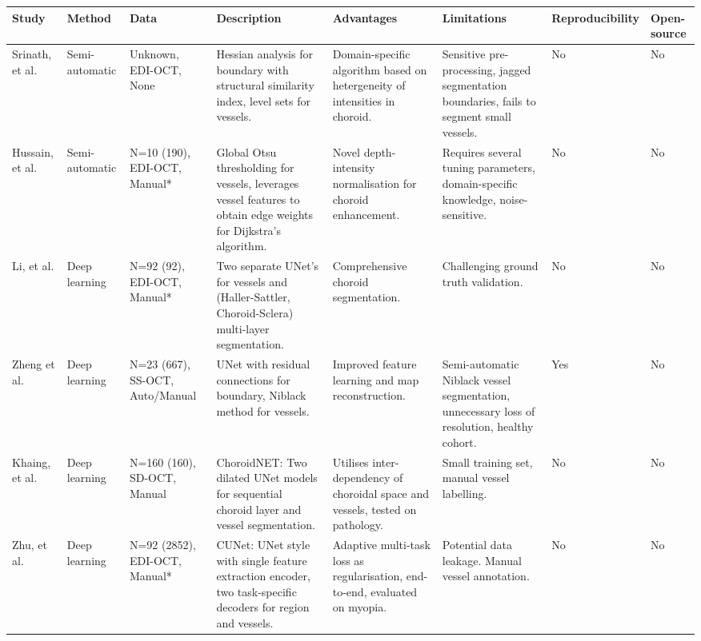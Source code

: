 \notsotiny

{\begin{longtable}{p{1cm}p{1cm}p{2cm}p{4.5cm}p{3.75cm}p{4cm}P{0.75cm}p{0.75cm}}
\toprule
Study & Method & Data & Description & Advantages & Limitations & Reproducibility & Open-source \\ \hline
\endfirsthead
\endhead
\midrule
\endfoot
\endlastfoot
Srinath, et al. \cite{srinath2014automated} & Semi-automatic & Unknown, EDI-OCT, None & Hessian analysis for boundary with structural similarity index, level sets for vessels. & Domain-specific algorithm based on hetergeneity of intensities in choroid. & Sensitive pre-processing, jagged segmentation boundaries, fails to segment small vessels. & No & No \\

Hussain, et al. \cite{hussain2018automated} & Semi-automatic & N=10 (190), EDI-OCT, Manual* & Global Otsu thresholding for vessels, leverages vessel features to obtain edge weights for Dijkstra's algorithm. & Novel depth-intensity normalisation for choroid enhancement. & Requires several tuning parameters, domain-specific knowledge, noise-sensitive. & No & No \\

Li, et al. \cite{li2021automated} & Deep learning & N=92 (92), EDI-OCT, Manual* & Two separate UNet's \cite{ronneberger2015u} for vessels and (Haller-Sattler, Choroid-Sclera) multi-layer segmentation. & Comprehensive choroid segmentation. & Challenging ground truth validation. & No & No \\

Zheng et al. \cite{zheng2021deep} & Deep learning & N=23 (667), SS-OCT, Auto/Manual & UNet \cite{ronneberger2015u} with residual connections for boundary, Niblack method for vessels. & Improved feature learning and map reconstruction. & Semi-automatic Niblack vessel segmentation, unnecessary loss of resolution, healthy cohort. & Yes & No \\

Khaing, et al. \cite{khaing2021choroidnet} & Deep learning & N=160 (160), SD-OCT, Manual & ChoroidNET: Two dilated UNet \cite{ronneberger2015u} models for sequential choroid layer and vessel segmentation. & Utilises inter-dependency of choroidal space and vessels, tested on pathology. & Small training set, manual vessel labelling. & No & No \\

Zhu, et al. \cite{zhu2022synergistically} & Deep learning & N=92 (2852), EDI-OCT, Manual* & CUNet: UNet \cite{ronneberger2015u} style with single feature extraction encoder, two task-specific decoders for region and vessels. & Adaptive multi-task loss as regularisation, end-to-end, evaluated on myopia. &  Potential data leakage. Manual vessel annotation. & No & No \\


\end{longtable}}
